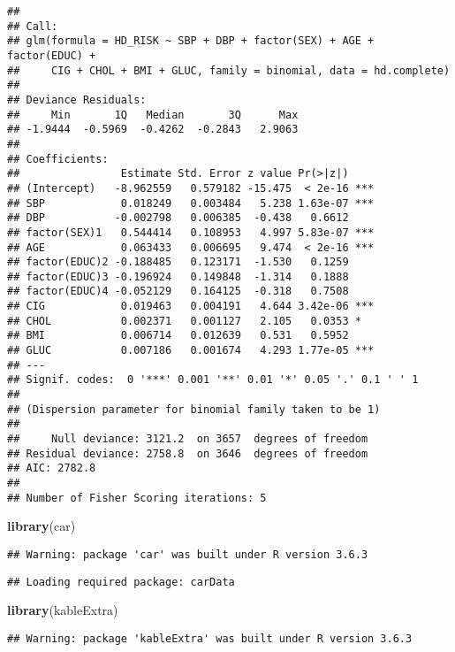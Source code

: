\documentclass[]{article}
\newenvironment{Shaded}{\begin{snugshade}}{\end{snugshade}}
\newcommand{\KeywordTok}[1]{\textcolor[rgb]{0.13,0.29,0.53}{\textbf{#1}}}
\newcommand{\NormalTok}[1]{#1}
\begin{document}
\begin{verbatim}
## 
## Call:
## glm(formula = HD_RISK ~ SBP + DBP + factor(SEX) + AGE + factor(EDUC) + 
##     CIG + CHOL + BMI + GLUC, family = binomial, data = hd.complete)
## 
## Deviance Residuals: 
##     Min       1Q   Median       3Q      Max  
## -1.9444  -0.5969  -0.4262  -0.2843   2.9063  
## 
## Coefficients:
##                Estimate Std. Error z value Pr(>|z|)    
## (Intercept)   -8.962559   0.579182 -15.475  < 2e-16 ***
## SBP            0.018249   0.003484   5.238 1.63e-07 ***
## DBP           -0.002798   0.006385  -0.438   0.6612    
## factor(SEX)1   0.544414   0.108953   4.997 5.83e-07 ***
## AGE            0.063433   0.006695   9.474  < 2e-16 ***
## factor(EDUC)2 -0.188485   0.123171  -1.530   0.1259    
## factor(EDUC)3 -0.196924   0.149848  -1.314   0.1888    
## factor(EDUC)4 -0.052129   0.164125  -0.318   0.7508    
## CIG            0.019463   0.004191   4.644 3.42e-06 ***
## CHOL           0.002371   0.001127   2.105   0.0353 *  
## BMI            0.006714   0.012639   0.531   0.5952    
## GLUC           0.007186   0.001674   4.293 1.77e-05 ***
## ---
## Signif. codes:  0 '***' 0.001 '**' 0.01 '*' 0.05 '.' 0.1 ' ' 1
## 
## (Dispersion parameter for binomial family taken to be 1)
## 
##     Null deviance: 3121.2  on 3657  degrees of freedom
## Residual deviance: 2758.8  on 3646  degrees of freedom
## AIC: 2782.8
## 
## Number of Fisher Scoring iterations: 5
\end{verbatim}

\begin{Shaded}
\begin{Highlighting}[]
\KeywordTok{library}\NormalTok{(car)}
\end{Highlighting}
\end{Shaded}

\begin{verbatim}
## Warning: package 'car' was built under R version 3.6.3
\end{verbatim}

\begin{verbatim}
## Loading required package: carData
\end{verbatim}

\begin{Shaded}
\begin{Highlighting}[]
\KeywordTok{library}\NormalTok{(kableExtra)}
\end{Highlighting}
\end{Shaded}

\begin{verbatim}
## Warning: package 'kableExtra' was built under R version 3.6.3
\end{verbatim}
\end{document}
